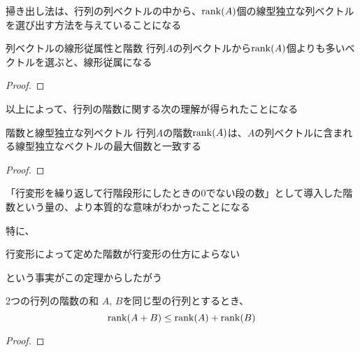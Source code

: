 \documentclass[../../../topic_linear-algebra]{subfiles}
\begin{document}
\br

掃き出し法は、行列の列ベクトルの中から、$\rank(A)$個の線型独立な列ベクトルを選び出す方法を与えていることになる

\begin{theorem}{列ベクトルの線形従属性と階数}
  行列$A$の列ベクトルから$\rank(A)$個よりも多いベクトルを選ぶと、線形従属になる
\end{theorem}

\begin{proof}
\end{proof}

\br

以上によって、行列の階数に関する次の理解が得られたことになる

\begin{theorem}{階数と線型独立な列ベクトル}
  行列$A$の階数$\rank(A)$は、$A$の列ベクトルに含まれる線型独立なベクトルの最大個数と一致する
\end{theorem}

\begin{proof}
\end{proof}

「行変形を繰り返して行階段形にしたときの0でない段の数」として導入した階数という量の、より本質的な意味がわかったことになる

\br

特に、
\begin{shaded}
  行変形によって定めた階数が行変形の仕方によらない
\end{shaded}
という事実がこの定理からしたがう

\sectionline

\begin{theorem}{2つの行列の階数の和}
  $A,\,B$を同じ型の行列とするとき、
  \begin{equation*}
    \rank(A+B) \leq \rank(A) + \rank(B)
  \end{equation*}
\end{theorem}

\begin{proof}
\end{proof}
\end{document}
